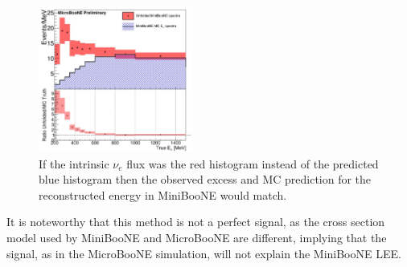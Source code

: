 \documentclass[a4paper]{article}
\newcommand{\nue}{$\nu_e$ }
\begin{document}
\begin{figure}[]
    \begin{center}
    \includegraphics[width=0.45\textwidth]{Sensitivity/lee_unfolded_signal.png}
    \caption{If the intrinsic \nue flux was the red histogram instead of the predicted blue histogram then the observed excess and MC prediction for the reconstructed energy in MiniBooNE would match.}
    \label{fig:lee_unfolded_signal}
    \end{center}
\end{figure}

It is noteworthy that this method is not a perfect signal, as the cross section model used by MiniBooNE and MicroBooNE are different, implying that the signal, as in the MicroBooNE simulation, will not explain the MiniBooNE LEE.
\end{document}
